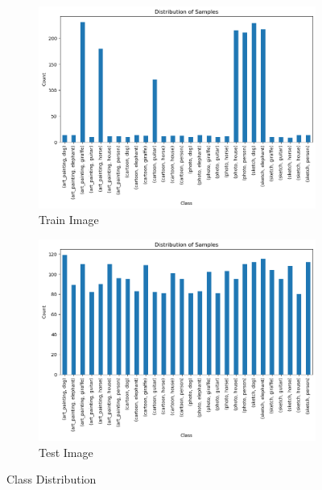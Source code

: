 \documentclass{article}
\begin{document}
\begin{figure}[h!]
    \centering
    \begin{subfigure}{0.45\textwidth}
        \includegraphics[width=\textwidth]{./pic/class_distribution_1641.png}
        \caption{Train Image}
    \end{subfigure}
    \hfill %
    \begin{subfigure}{0.45\textwidth}
        \includegraphics[width=\textwidth]{./pic/class_distribution_2723.png}
        \caption{Test Image}
    \end{subfigure}
    \caption{Class Distribution}
    \label{fig:class_distribution}
\end{figure}
\end{document}
